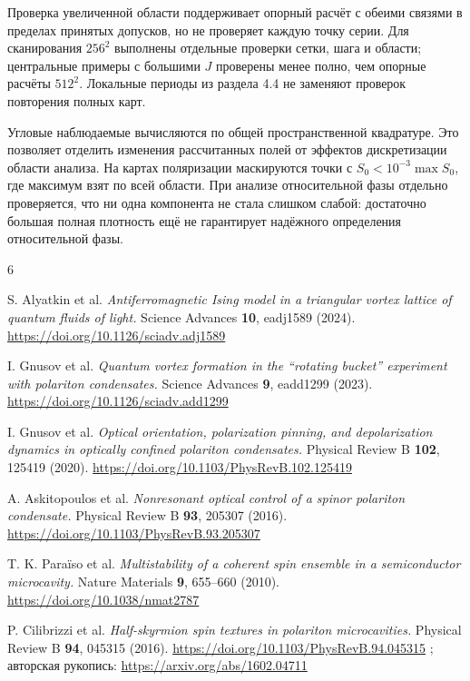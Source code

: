 \documentclass[12pt,a4paper]{article}
\begin{document}
Проверка увеличенной области поддерживает опорный расчёт с обеими связями в пределах принятых допусков, но не проверяет каждую точку серии. Для сканирования \(256^2\) выполнены отдельные проверки сетки, шага и области; центральные примеры с большими \(J\) проверены менее полно, чем опорные расчёты \(512^2\). Локальные периоды из раздела 4.4 не заменяют проверок повторения полных карт.

Угловые наблюдаемые вычисляются по общей пространственной квадратуре. Это позволяет отделить изменения рассчитанных полей от эффектов дискретизации области анализа. На картах поляризации маскируются точки с \(S_0<10^{-3}\max S_0\), где максимум взят по всей области. При анализе относительной фазы отдельно проверяется, что ни одна компонента не стала слишком слабой: достаточно большая полная плотность ещё не гарантирует надёжного определения относительной фазы.

\clearpage\begin{thebibliography}{6}

 S. Alyatkin et al. \emph{Antiferromagnetic Ising model in a triangular vortex lattice of quantum fluids of light.} Science Advances \textbf{10}, eadj1589 (2024). \url{https://doi.org/10.1126/sciadv.adj1589}

 I. Gnusov et al. \emph{Quantum vortex formation in the ``rotating bucket'' experiment with polariton condensates.} Science Advances \textbf{9}, eadd1299 (2023). \url{https://doi.org/10.1126/sciadv.add1299}

 I. Gnusov et al. \emph{Optical orientation, polarization pinning, and depolarization dynamics in optically confined polariton condensates.} Physical Review B \textbf{102}, 125419 (2020). \url{https://doi.org/10.1103/PhysRevB.102.125419}

 A. Askitopoulos et al. \emph{Nonresonant optical control of a spinor polariton condensate.} Physical Review B \textbf{93}, 205307 (2016). \url{https://doi.org/10.1103/PhysRevB.93.205307}

 T. K. Paraïso et al. \emph{Multistability of a coherent spin ensemble in a semiconductor microcavity.} Nature Materials \textbf{9}, 655--660 (2010). \url{https://doi.org/10.1038/nmat2787}

 P. Cilibrizzi et al. \emph{Half-skyrmion spin textures in polariton microcavities.} Physical Review B \textbf{94}, 045315 (2016). \url{https://doi.org/10.1103/PhysRevB.94.045315} ; авторская рукопись: \url{https://arxiv.org/abs/1602.04711}

\end{thebibliography}
\end{document}
